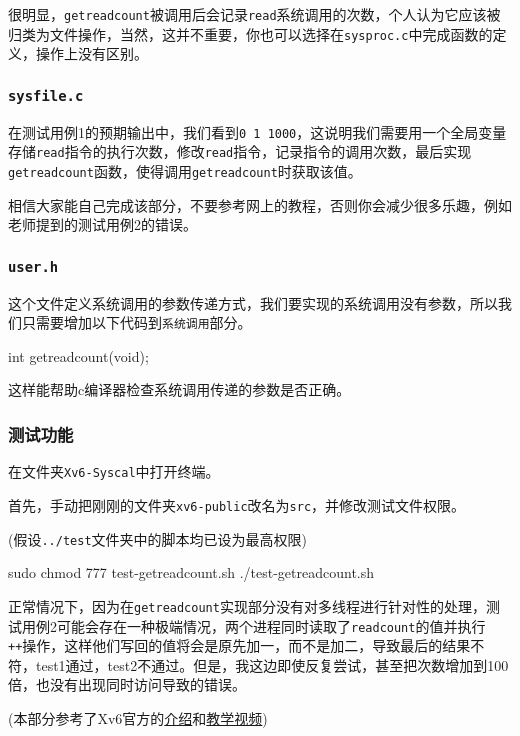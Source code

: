 \documentclass[
]{article}
\newenvironment{Shaded}{}{}
\newcommand{\DataTypeTok}[1]{\textcolor[rgb]{0.56,0.13,0.00}{#1}}
\newcommand{\ExtensionTok}[1]{#1}
\newcommand{\FunctionTok}[1]{\textcolor[rgb]{0.02,0.16,0.49}{#1}}
\newcommand{\NormalTok}[1]{#1}
\newcommand{\OperatorTok}[1]{\textcolor[rgb]{0.40,0.40,0.40}{#1}}
\begin{document}
很明显，\texttt{getreadcount}被调用后会记录\texttt{read}系统调用的次数，个人认为它应该被归类为文件操作，当然，这并不重要，你也可以选择在\texttt{sysproc.c}中完成函数的定义，操作上没有区别。

\subsubsection{\texorpdfstring{\texttt{sysfile.c}}{sysfile.c}}\label{sysfilec}

在测试用例1的预期输出中，我们看到\texttt{0\ 1\ 1000}，这说明我们需要用一个全局变量存储\texttt{read}指令的执行次数，修改\texttt{read}指令，记录指令的调用次数，最后实现\texttt{getreadcount}函数，使得调用\texttt{getreadcount}时获取该值。

相信大家能自己完成该部分，不要参考网上的教程，否则你会减少很多乐趣，例如老师提到的测试用例2的错误。

\subsubsection{\texorpdfstring{\texttt{user.h}}{user.h}}\label{userh}

这个文件定义系统调用的参数传递方式，我们要实现的系统调用没有参数，所以我们只需要增加以下代码到\texttt{系统调用}部分。

\begin{Shaded}
  \begin{Highlighting}[]
    \DataTypeTok{int}\NormalTok{ getreadcount}\OperatorTok{(}\DataTypeTok{void}\OperatorTok{);}
  \end{Highlighting}
\end{Shaded}

这样能帮助c编译器检查系统调用传递的参数是否正确。

\subsubsection{测试功能}\label{ux6d4bux8bd5ux529fux80fd}

在文件夹\texttt{Xv6-Syscal}中打开终端。

首先，手动把刚刚的文件夹\texttt{xv6-public}改名为\texttt{src}，并修改测试文件权限。

(假设\texttt{../test}文件夹中的脚本均已设为最高权限)

\begin{Shaded}
  \begin{Highlighting}[]
    \FunctionTok{sudo}\NormalTok{ chmod 777 test{-}getreadcount.sh}
    \ExtensionTok{./test{-}getreadcount.sh}
  \end{Highlighting}
\end{Shaded}

正常情况下，因为在\texttt{getreadcount}实现部分没有对多线程进行针对性的处理，测试用例2可能会存在一种极端情况，两个进程同时读取了\texttt{readcount}的值并执行\texttt{++}操作，这样他们写回的值将会是原先加一，而不是加二，导致最后的结果不符，test1通过，test2不通过。但是，我这边即使反复尝试，甚至把次数增加到100倍，也没有出现同时访问导致的错误。

(本部分参考了Xv6官方的\href{https://github.com/remzi-arpacidusseau/ostep-projects/tree/master/initial-xv6}{介绍}和\href{https://www.bilibili.com/video/BV1mJ4m1777o/}{教学视频})
\end{document}
